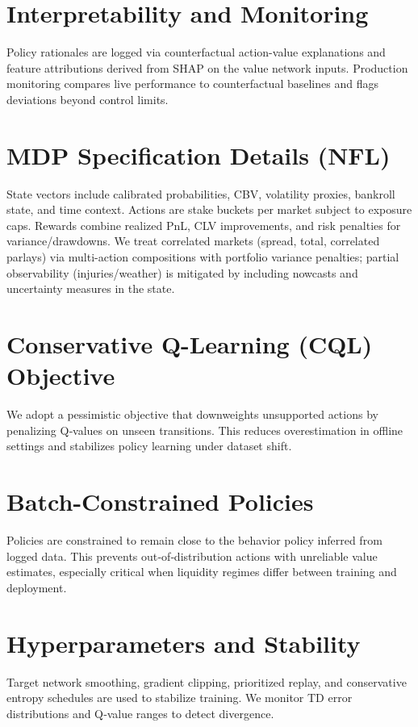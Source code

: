 \section{Interpretability and Monitoring}
Policy rationales are logged via counterfactual action-value explanations and feature attributions derived from SHAP on the value network inputs. Production monitoring compares live performance to counterfactual baselines and flags deviations beyond control limits.

\section{MDP Specification Details (NFL)}
State vectors include calibrated probabilities, CBV, volatility proxies, bankroll state, and time context. Actions are stake buckets per market subject to exposure caps. Rewards combine realized PnL, CLV improvements, and risk penalties for variance/drawdowns.
We treat correlated markets (spread, total, correlated parlays) via multi-action compositions with portfolio variance penalties; partial observability (injuries/weather) is mitigated by including nowcasts and uncertainty measures in the state.

\section{Conservative Q-Learning (CQL) Objective}
We adopt a pessimistic objective that downweights unsupported actions by penalizing Q‑values on unseen transitions. This reduces overestimation in offline settings and stabilizes policy learning under dataset shift.

\section{Batch-Constrained Policies}
Policies are constrained to remain close to the behavior policy inferred from logged data. This prevents out‑of‑distribution actions with unreliable value estimates, especially critical when liquidity regimes differ between training and deployment.

\section{Hyperparameters and Stability}
Target network smoothing, gradient clipping, prioritized replay, and conservative entropy schedules are used to stabilize training. We monitor TD error distributions and Q‑value ranges to detect divergence.

